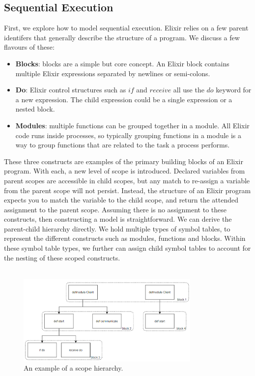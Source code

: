 \subsection{Sequential Execution} \label{sec:sequential_execution}
First, we explore how to model sequential execution. Elixir relies on a few parent identifers that generally describe the structure of a program. We discuss a few flavours of these:
\begin{itemize}
    \item \textbf{Blocks}: blocks are a simple but core concept. An Elixir block contains multiple Elixir expressions separated by newlines or semi-colons.
    \item \textbf{Do}: Elixir control structures such as $if$ and $receive$ all use the $do$ keyword for a new expression. The child expression could be a single expression or a nested block.
    \item \textbf{Modules}: multiple functions can be grouped together in a module. All Elixir code runs inside processes, so typically grouping functions in a module is a way to group functions that are related to the task a process performs.
\end{itemize}
These three constructs are examples of the primary building blocks of an Elixir program. With each, a new level of scope is introduced. Declared variables from parent scopes are accessible in child scopes, but any match to re-assign a variable from the parent scope will not persist. Instead, the structure of an Elixir program expects you to match the variable to the child scope, and return the attended assignment to the parent scope. Assuming there is no assignment to these constructs, then constructing a model is straightforward. We can derive the parent-child hierarchy directly. We hold multiple types of symbol tables, to represent the different constructs such as modules, functions and blocks. Within these symbol table types, we further can assign child symbol tables to account for the nesting of these scoped constructs.
\\ \\
\begin{figure}[h]
    \centering
    \includegraphics[width=0.8\textwidth]{images/sym_Table.png}
    \caption{An example of a scope hierarchy.}
    \label{fig:scope_hierarchy}
\end{figure}
\\ \\

